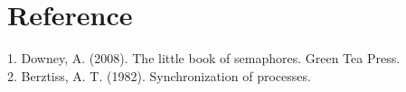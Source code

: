 \documentclass[12pt]{article}
\begin{document}
\section{Reference}
1. Downey, A. (2008). The little book of semaphores. Green Tea Press.\\
2. Berztiss, A. T. (1982). Synchronization of processes.




 
 
\end{document}
